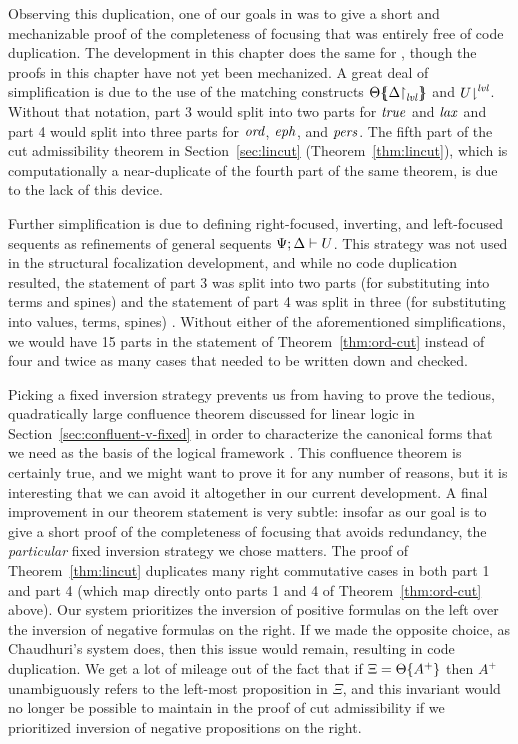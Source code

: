Observing this duplication, one of our goals in
\cite{simmons11structural} was to give a short and mechanizable proof
of the completeness of focusing that was entirely free of code
duplication. The development in this chapter does the same for \ollll,
though the proofs in this chapter have not yet been mechanized.  A
great deal of simplification is due to the use of the matching
constructs ${\Theta}\mbox{$\{\hspace{-4pt}\{$}{\ensuremath{{\Delta}{\upharpoonright}_{{\it lvl}}}}\mbox{$\}\hspace{-4pt}\}$}$ and
${U}{\downharpoonright}^{{\it lvl}}$. Without that notation, part 3 would split
into two parts for ${\it true}$ and ${\it lax}$ and part 4 would split into
three parts for ${\it ord}$, ${\it eph}$, and ${\it pers}$. The fifth part of the
cut admissibility theorem in Section~\ref{sec:lincut} 
(Theorem~\ref{thm:lincut}),
which is computationally a near-duplicate of the fourth part of the
same theorem, is due to the lack of this device.

Further simplification is due to defining right-focused, inverting,
and left-focused sequents as refinements of general sequents
${\Psi};{\Delta} \vdash {U} \mathstrut$. This strategy was not used in the structural
focalization development, and while no code duplication resulted, the
statement of part 3 was split into two parts (for substituting into
terms and spines) and the statement of part 4 was split in three (for
substituting into values, terms, spines) \cite{simmons11structural}.
Without either of the aforementioned simplifications, we would have 15
parts in the statement of Theorem~\ref{thm:ord-cut} instead of four
and twice as many cases that needed to be
written down and checked.

Picking a fixed inversion strategy prevents us from having to prove
the tedious, quadratically large confluence theorem discussed for linear
logic in Section~\ref{sec:confluent-v-fixed} in order to characterize
the canonical forms that we need as the basis of the logical framework
\sls. This confluence theorem is certainly true, and we might want to
prove it for any number of reasons, but it is interesting that we can
avoid it altogether in our current development.  A final improvement
in our theorem statement is very subtle: insofar as our goal is to
give a short proof of the completeness of focusing that avoids
redundancy, the {\it particular} fixed inversion strategy we chose
matters. The proof of Theorem~\ref{thm:lincut} duplicates many right
commutative cases in both part 1 and part 4 (which map directly onto
parts 1 and 4 of Theorem~\ref{thm:ord-cut} above). Our system
prioritizes the inversion of positive formulas on the left over the
inversion of negative formulas on the right. If we made the opposite
choice, as Chaudhuri's system does, then this issue would remain,
resulting in code duplication.  We get a lot of mileage out of the
fact that if $\Xi = {\Theta}\{{A^+}\}$ then $A^+$ unambiguously
refers to the left-most proposition in $\Xi$, and this invariant would
no longer be possible to maintain in the proof of cut admissibility if
we prioritized inversion of negative propositions on the right.


